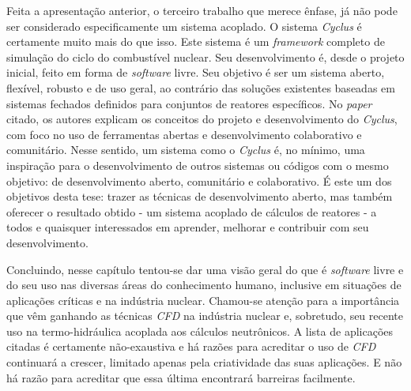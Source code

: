 Feita a apresentação anterior, o terceiro trabalho que merece ênfase, já não pode ser considerado
especificamente um sistema acoplado. O sistema \textit{Cyclus} \cite{Huff2016} é certamente muito mais
do que isso. Este sistema é um \textit{framework} completo de simulação do ciclo do combustível nuclear.
Seu desenvolvimento é, desde o projeto inicial, feito em forma de \textit{software} livre. Seu objetivo é ser um sistema aberto,
flexível, robusto e de uso geral, ao contrário das soluções existentes baseadas em sistemas fechados
definidos para conjuntos de reatores específicos.
No \textit{paper} citado, os autores explicam os conceitos do projeto e desenvolvimento do \textit{Cyclus}, com
foco no uso de ferramentas abertas e desenvolvimento colaborativo e comunitário. Nesse sentido, um sistema
como o \textit{Cyclus} é, no mínimo, uma inspiração para o desenvolvimento de outros sistemas ou códigos
com o mesmo objetivo: de desenvolvimento aberto, comunitário e colaborativo. É este um dos objetivos
desta tese: trazer as técnicas de desenvolvimento aberto, mas também oferecer o resultado obtido -
um sistema acoplado de cálculos de reatores - a todos e quaisquer interessados em aprender, melhorar
e contribuir com seu desenvolvimento.

Concluindo, nesse capítulo tentou-se dar uma visão geral do que é \textit{software} livre e do
seu uso nas diversas áreas do conhecimento humano, inclusive em situações de aplicações
críticas e na indústria nuclear. Chamou-se atenção para a importância que vêm ganhando as
técnicas \textit{CFD} na indústria nuclear e, sobretudo, seu recente uso na termo-hidráulica acoplada aos cálculos
neutrônicos. A lista de aplicações citadas é certamente não-exaustiva e há razões para
acreditar o uso de \textit{CFD} continuará a crescer, limitado apenas pela criatividade
das suas aplicações. E não há razão para acreditar que essa última encontrará barreiras
facilmente.




%

